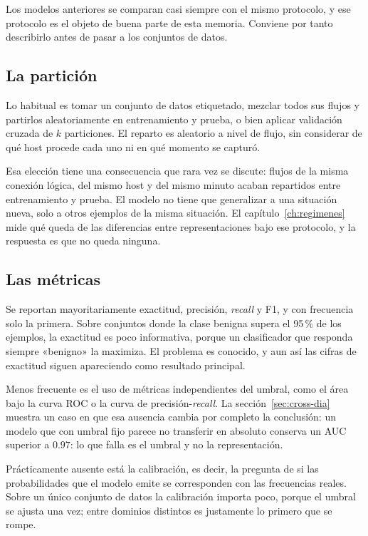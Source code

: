 Los modelos anteriores se comparan casi siempre con el mismo protocolo, y ese
protocolo es el objeto de buena parte de esta memoria. Conviene por tanto
describirlo antes de pasar a los conjuntos de datos.

\subsection*{La partición}

Lo habitual es tomar un conjunto de datos etiquetado, mezclar todos sus flujos y
partirlos aleatoriamente en entrenamiento y prueba, o bien aplicar validación
cruzada de $k$ particiones. El reparto es aleatorio a nivel de flujo, sin
considerar de qué host procede cada uno ni en qué momento se capturó.

Esa elección tiene una consecuencia que rara vez se discute: flujos de la misma
conexión lógica, del mismo host y del mismo minuto acaban repartidos entre
entrenamiento y prueba. El modelo no tiene que generalizar a una situación nueva,
solo a otros ejemplos de la misma situación. El capítulo~\ref{ch:regimenes} mide
qué queda de las diferencias entre representaciones bajo ese protocolo, y la
respuesta es que no queda ninguna.

\subsection*{Las métricas}

Se reportan mayoritariamente exactitud, precisión, \emph{recall} y F1, y con
frecuencia solo la primera. Sobre conjuntos donde la clase benigna supera el
95\,\% de los ejemplos, la exactitud es poco informativa, porque un clasificador
que responda siempre «benigno» la maximiza. El problema es conocido, y aun así
las cifras de exactitud siguen apareciendo como resultado principal.

Menos frecuente es el uso de métricas independientes del umbral, como el área
bajo la curva ROC o la curva de precisión-\emph{recall}. La
sección~\ref{sec:cross-dia} muestra un caso en que esa ausencia cambia por
completo la conclusión: un modelo que con umbral fijo parece no transferir en
absoluto conserva un AUC superior a $0.97$: lo que falla es el
umbral y no la representación.

Prácticamente ausente está la calibración, es decir, la pregunta de si las
probabilidades que el modelo emite se corresponden con las frecuencias reales.
Sobre un único conjunto de datos la calibración importa poco, porque el umbral se
ajusta una vez; entre dominios distintos es justamente lo primero que se rompe.

